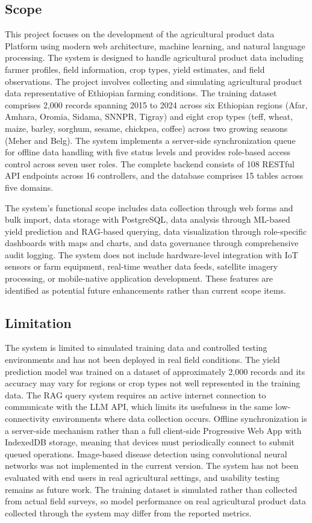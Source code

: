 \documentclass[12pt,a4paper,oneside]{report}
\begin{document}
\subsection{Scope}
This project focuses on the development of the agricultural product data Platform using modern web architecture, machine learning, and natural language processing. The system is designed to handle agricultural product data including farmer profiles, field information, crop types, yield estimates, and field observations. The project involves collecting and simulating agricultural product data representative of Ethiopian farming conditions. The training dataset comprises 2,000 records spanning 2015 to 2024 across six Ethiopian regions (Afar, Amhara, Oromia, Sidama, SNNPR, Tigray) and eight crop types (teff, wheat, maize, barley, sorghum, sesame, chickpea, coffee) across two growing seasons (Meher and Belg). The system implements a server-side synchronization queue for offline data handling with five status levels and provides role-based access control across seven user roles. The complete backend consists of 108 RESTful API endpoints across 16 controllers, and the database comprises 15 tables across five domains.

The system's functional scope includes data collection through web forms and bulk import, data storage with PostgreSQL, data analysis through ML-based yield prediction and RAG-based querying, data visualization through role-specific dashboards with maps and charts, and data governance through comprehensive audit logging. The system does not include hardware-level integration with IoT sensors or farm equipment, real-time weather data feeds, satellite imagery processing, or mobile-native application development. These features are identified as potential future enhancements rather than current scope items.

\subsection{Limitation}
The system is limited to simulated training data and controlled testing environments and has not been deployed in real field conditions. The yield prediction model was trained on a dataset of approximately 2,000 records and its accuracy may vary for regions or crop types not well represented in the training data. The RAG query system requires an active internet connection to communicate with the LLM API, which limits its usefulness in the same low-connectivity environments where data collection occurs. Offline synchronization is a server-side mechanism rather than a full client-side Progressive Web App with IndexedDB storage, meaning that devices must periodically connect to submit queued operations. Image-based disease detection using convolutional neural networks was not implemented in the current version. The system has not been evaluated with end users in real agricultural settings, and usability testing remains as future work. The training dataset is simulated rather than collected from actual field surveys, so model performance on real agricultural product data collected through the system may differ from the reported metrics.
\end{document}
